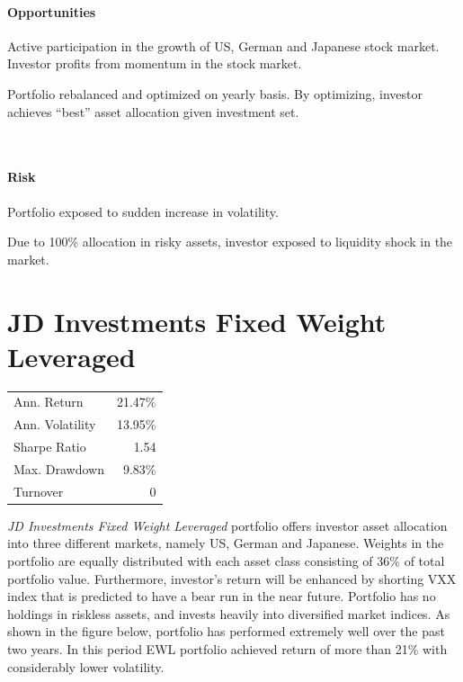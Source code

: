 \documentclass[11pt, parskip=full, DIV=14, headings=small, footsepline, footinclude=false, headsepline]{scrreprt}
\begin{document}
\begin{minipage}[t]{0.49\textwidth}
  \paragraph{Opportunities}
  \begin{sit}
    \item Active participation in the growth of US, German and Japanese stock market. Investor profits from momentum in the stock market.
    \item Portfolio rebalanced and optimized on yearly basis. By optimizing, investor achieves “best” asset allocation given investment set.
  \end{sit}
\end{minipage}
~~
\begin{minipage}[t]{0.49\textwidth}
  \paragraph{Risk}
  \begin{sit}
    \item Portfolio exposed to sudden increase in volatility.
    \item Due to 100\% allocation in risky assets, investor exposed to liquidity shock in the market.
  \end{sit}
\end{minipage}

\newpage\section{JD Investments Fixed Weight Leveraged}
\begin{table}
  \begin{tabular}{lr}
\toprule
Ann. Return & 21.47\%\\
Ann. Volatility & 13.95\%\\
Sharpe Ratio & 1.54 \\
Max. Drawdown & 9.83\% \\
Turnover & 0\\
\bottomrule
\end{tabular}
\end{table}
\textit{JD Investments Fixed Weight Leveraged} portfolio offers investor asset allocation into three different markets, namely US, German and Japanese. Weights in the portfolio are equally distributed with each asset class consisting of 36\% of total portfolio value. Furthermore, investor’s return will be enhanced by shorting VXX index that is predicted to have a bear run in the near future. Portfolio has no holdings in riskless assets, and invests heavily into diversified market indices. As shown in the figure below, portfolio has performed extremely well over the past two years. In this period EWL portfolio achieved return of more than 21\% with considerably lower volatility. 
\end{document}
